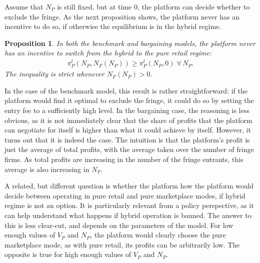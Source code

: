 \documentclass[a4paper]{article}
\newtheorem{proposition}{Proposition}
\begin{document}
Assume that $N_P$ is still fixed, but at time 0, the platform can decide whether to exclude the fringe.
As the next proposition shows, the platform never has an incentive to do so, if otherwise the equilibrium is in the hybrid regime.
\begin{proposition}
    \label{prop:hybrid_vs_retail}
    In both the benchmark and bargaining models, the platform never has an incentive to switch from the hybrid to the pure retail regime:
    \begin{align*}
        \pi_P^t(N_P, N_F(N_P)) \geq \pi_P^t(N_P, 0) \;\forall\, N_P.
    \end{align*}
    The inequality is strict whenever $N_F(N_P) > 0$.
\end{proposition}
In the case of the benchmark model, this result is rather straightforward: if the platform would find it optimal to exclude the fringe, it could do so by setting the entry fee to a sufficiently high level.
In the bargaining case, the reasoning is less obvious, as it is not immediately clear that the share of profits that the platform can negotiate for itself is higher than what it could achieve by itself.
However, it turns out that it is indeed the case.
The intuition is that the platform's profit is just the average of total profits, with the average taken over the number of fringe firms.
As total profits are increasing in the number of the fringe entrants, this average is also increasing in $N_F$.

A related, but different question is whether the platform how the platform would decide between operating in pure retail and pure marketplace modes, if hybrid regime is not an option.
It is particularly relevant from a policy perspective, as it can help understand what happens if hybrid operation is banned.
The answer to this is less clear-cut, and depends on the parameters of the model.
For low enough values of $V_P$ and $N_P$, the platform would clearly choose the pure marketplace mode, as with pure retail, its profits can be arbitrarily low.
The opposite is true for high enough values of $V_P$ and $N_P$.
\end{document}

